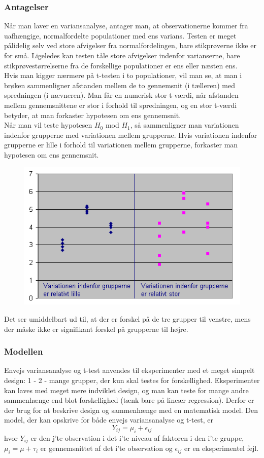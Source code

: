 \documentclass[11pt]{article}
\begin{document}
\subsubsection{Antagelser}
Når man laver en variansanalyse, antager man, at observationerne kommer fra uafhængige, normalfordelte populationer med ens varians. Testen er meget pålidelig selv ved store afvigelser fra normalfordelingen, bare stikprøverne ikke er for små. Ligeledes kan testen tåle store afvigelser indenfor varianserne, bare stikprøvestørrelserne fra de forskellige populationer er ens eller næsten ens.\\[0.2cm]
Hvis man kigger nærmere på t-testen i to populationer, vil man se, at man i brøken sammenligner afstanden mellem de to gennemsnit (i tælleren) med spredningen (i nævneren). Man får en numerisk stor t-værdi, når afstanden mellem gennemsnittene er stor i forhold til spredningen, og en stor t-værdi betyder, at man forkaster hypotesen om ens gennemsnit.\\[0.2cm]
Når man vil teste hypotesen $H_0$ mod $H_1$, så sammenligner man variationen indenfor grupperne med variationen mellem grupperne. Hvis variationen indenfor grupperne er lille i forhold til variationen mellem grupperne, forkaster man hypotesen om ens gennemsnit.
\begin{figure}[H]
\centering
\includegraphics[scale=0.5]{img/Selection_022}
\end{figure}
Det ser umiddelbart ud til, at der er forskel på de tre grupper til venstre, mens der måske ikke er signifikant forskel på grupperne til højre. 
\subsubsection{Modellen}
Envejs variansanalyse og t-test anvendes til eksperimenter med et meget simpelt design: 1 - 2 - mange grupper, der kun skal testes for forskellighed. Eksperimenter kan laves med meget mere indviklet design, og man kan teste for mange andre sammenhænge end blot forskellighed (tænk bare på lineær regression). Derfor er der brug for at beskrive design og sammenhænge med en matematisk model. Den model, der kan opskrive for både envejs variansanalyse og t-test, er
$$Y_{ij}=\mu_i+\epsilon_{ij}$$
hvor $Y_{ij}$ er den j'te observation i det i'te niveau af faktoren i den i'te gruppe, $\mu_i=\mu+\tau_i$ er gennemsnittet af det i'te observation og $\epsilon_{ij}$ er en eksperimentel fejl.
\end{document}
